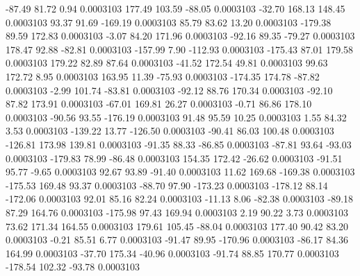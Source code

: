       -87.49       81.72        0.94     0.0003103
      177.49      103.59      -88.05     0.0003103
      -32.70      168.13      148.45     0.0003103
       93.37       91.69     -169.19     0.0003103
       85.79       83.62       13.20     0.0003103
     -179.38       89.59      172.83     0.0003103
       -3.07       84.20      171.96     0.0003103
      -92.16       89.35      -79.27     0.0003103
      178.47       92.88      -82.81     0.0003103
     -157.99        7.90     -112.93     0.0003103
     -175.43       87.01      179.58     0.0003103
      179.22       82.89       87.64     0.0003103
      -41.52      172.54       49.81     0.0003103
       99.63      172.72        8.95     0.0003103
      163.95       11.39      -75.93     0.0003103
     -174.35      174.78      -87.82     0.0003103
       -2.99      101.74      -83.81     0.0003103
      -92.12       88.76      170.34     0.0003103
      -92.10       87.82      173.91     0.0003103
      -67.01      169.81       26.27     0.0003103
       -0.71       86.86      178.10     0.0003103
      -90.56       93.55     -176.19     0.0003103
       91.48       95.59       10.25     0.0003103
        1.55       84.32        3.53     0.0003103
     -139.22       13.77     -126.50     0.0003103
      -90.41       86.03      100.48     0.0003103
     -126.81      173.98      139.81     0.0003103
      -91.35       88.33      -86.85     0.0003103
      -87.81       93.64      -93.03     0.0003103
     -179.83       78.99      -86.48     0.0003103
      154.35      172.42      -26.62     0.0003103
      -91.51       95.77       -9.65     0.0003103
       92.67       93.89      -91.40     0.0003103
       11.62      169.68     -169.38     0.0003103
     -175.53      169.48       93.37     0.0003103
      -88.70       97.90     -173.23     0.0003103
     -178.12       88.14     -172.06     0.0003103
       92.01       85.16       82.24     0.0003103
      -11.13        8.06      -82.38     0.0003103
      -89.18       87.29      164.76     0.0003103
     -175.98       97.43      169.94     0.0003103
        2.19       90.22        3.73     0.0003103
       73.62      171.34      164.55     0.0003103
      179.61      105.45      -88.04     0.0003103
      177.40       90.42       83.20     0.0003103
       -0.21       85.51        6.77     0.0003103
      -91.47       89.95     -170.96     0.0003103
      -86.17       84.36      164.99     0.0003103
      -37.70      175.34      -40.96     0.0003103
      -91.74       88.85      170.77     0.0003103
     -178.54      102.32      -93.78     0.0003103
